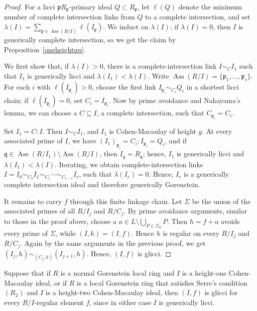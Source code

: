 \documentclass[11pt,letterpaper]{amsart}
\newcommand{\seq}{\subseteq}
\DeclareMathOperator{\Ass}{Ass}
\theoremstyle{plain}
\theoremstyle{definition}
\theoremstyle{remark}
\begin{document}
\begin{proof}
For a licci $\mathfrak pR_{\mathfrak p}$-primary ideal $Q\subset R_{\mathfrak p}$,
let $\ell(Q)$ denote the minimum number of complete intersection links from $Q$
to a complete intersection, and set $\lambda(I)=\sum_{\mathfrak p\in\Ass(R/I)}\ell(I_{\mathfrak p})$. We induct on $\lambda(I)$; if $\lambda(I)=0$, then $I$ is generically complete intersection, so we get the claim by Proposition~\ref{oneheightup}.

We first show that, if $\lambda(I)>0$, there is a complete-intersection link
$I\sim_C I_1$ such that $I_1$ is generically licci and
$\lambda(I_1)<\lambda(I)$. Write
$\Ass(R/I)=\{\mathfrak p_1,\ldots,\mathfrak p_s\}$. For each $i$ with
$\ell(I_{\mathfrak p_i})>0$, choose the first link
$I_{\mathfrak p_i}\sim_{C_i}Q_i$ in a shortest licci chain; if
$\ell(I_{\mathfrak p_i})=0$, set $C_i=I_{\mathfrak p_i}$. Now by prime avoidance and Nakayama's lemma, we can choose a $C\seq I$, a complete intersection, such that $C_{\mathfrak p_i}=C_i$.

Set $I_1=C:I$. Then
$I\sim_C I_1$, and $I_1$ is Cohen-Macaulay of height $g$. At every associated prime of $I$, we have $(I_1)_{\mathfrak p_i}
=C_i:I_{\mathfrak p_i}=Q_i$, and if 
$\mathfrak q\in\Ass(R/I_1)\setminus\Ass(R/I)$, then
$I_{\mathfrak q}=R_{\mathfrak q}$; hence, $I_1$ is generically licci and
$\lambda(I_1)<\lambda(I)$. Iterating, we obtain complete-intersection links $
I=I_0\sim_{C_0}I_1\sim_{C_1}\cdots\sim_{C_{r-1}}I_r$, such that $\lambda(I_r)=0$. Hence, $I_r$ is a generically complete intersection ideal
and therefore generically Gorenstein.

It remains to carry $f$ through this finite linkage chain. Let $\Sigma$ be the
union of the associated primes of all $R/I_j$ and $R/C_j$. By prime avoidance arguments, similar to those in the proof above, choose a $a\in L\setminus\bigcup_{P\in\Sigma_0}P$. Then $h=f+a$ avoids every prime of $\Sigma$, while $(I,h)=(I,f)$. Hence $h$ is
regular on every $R/I_j$ and $R/C_j$. Again by the same arguments in the previous proof, we get $(I_j,h)\sim_{(C_j,h)}(I_{j+1},h)$. Hence, $(I,f)$ is glicci. 
\end{proof}

Suppose that if $R$ is a normal Gorenstein local ring and $I$ is a height-one
Cohen-Macaulay ideal, or if $R$ is a local Gorenstein ring that satisfies Serre's
condition $(R_2)$ and $I$ is a height-two Cohen-Macaulay ideal, then
$(I,f)$ is glicci for every $R/I$-regular element $f$, since in either
case $I$ is generically licci.
\end{document}
